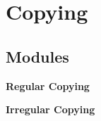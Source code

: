 \section{Copying}
\label{group__copying}
\subsection*{Modules}
\begin{CompactItemize}
\item 
{\bf Regular Copying}
\item 
{\bf Irregular Copying}
\end{CompactItemize}
